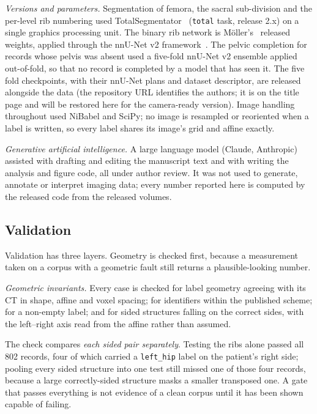 \documentclass[aapm,mph,amsmath,amssymb,reprint]{revtex4-2}
\newif\ifreview \reviewtrue
\begin{document}
\emph{Versions and parameters.} Segmentation of femora, the sacral sub-division and the
per-level rib numbering used TotalSegmentator~\cite{totalsegmentator} (\texttt{total} task,
release 2.x) on a single graphics processing unit. The binary rib network is
M\"oller's~\cite{moller2026} released weights, applied through the nnU-Net v2
framework~\cite{nnunet}. The pelvic completion for records whose pelvis was absent used a
five-fold nnU-Net v2 ensemble applied out-of-fold, so that no record is completed by a
model that has seen it. The five fold
checkpoints, with their nnU-Net plans and dataset descriptor, are released alongside the
data (\ifreview the repository URL identifies the authors; it is on the title page and will be
restored here for the camera-ready version\else\url{https://huggingface.co/OpenSpineConsortium/spinopelvic-seg-checkpoints}, trained with \url{https://github.com/Gregory-Schwing-MD-PhD/spinesurg-ct-nnunet} at commit 50b209f\fi). Image handling
throughout used NiBabel and SciPy; no image is resampled or reoriented when a label is
written, so every label shares its image's grid and affine exactly.

\emph{Generative artificial intelligence.} A large language model (Claude, Anthropic)
assisted with drafting and editing the manuscript text and with writing the analysis and
figure code, all under author review. It was not used to generate, annotate or interpret
imaging data; every number reported here is computed by the released code from the
released volumes.

\subsection{Validation}
\label{sec:validation}


Validation has three layers. Geometry is checked first, because a measurement taken on a corpus with a geometric fault still returns a plausible-looking number.

\emph{Geometric invariants.} Every case is checked for label geometry agreeing with its CT
in shape, affine and voxel spacing; for identifiers within the published scheme; for a
non-empty label; and for sided structures falling on the correct sides, with the left--right
axis read from the affine rather than assumed. 

The check compares \emph{each sided pair separately}. Testing the ribs alone passed all
802 records, four of which carried a \texttt{left\_hip} label on the patient's right side;
pooling every sided structure into one test still missed one of those four records, because
a large correctly-sided structure masks a smaller transposed one. A gate that passes everything is
not evidence of a clean corpus until it has been shown capable of failing.
\end{document}
